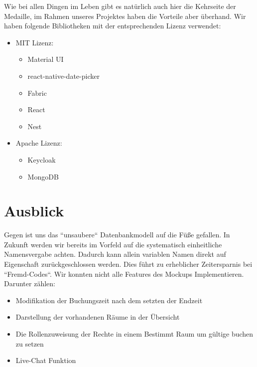 Wie bei allen Dingen im Leben gibt es natürlich auch hier die Kehrseite der Medaille, im Rahmen unseres Projektes haben die Vorteile aber überhand. 
Wir haben folgende Bibliotheken mit der entsprechenden Lizenz verwendet:

\begin{itemize}
\item	MIT Lizenz:
\begin{itemize}
    \item	Material UI
    \item	react-native-date-picker
    \item	Fabric
    \item	React
    \item	Nest
\end{itemize}
\end{itemize}
\begin{itemize}
    \item	Apache Lizenz:
    \begin{itemize}
\item	Keycloak
\item	MongoDB
\end{itemize}
\end{itemize}


\section{Ausblick}
Gegen ist uns das “unsaubere“ Datenbankmodell auf die Füße gefallen. 
In Zukunft werden wir bereits im Vorfeld auf die systematisch einheitliche Namensvergabe achten. 
Dadurch kann allein variablen Namen direkt auf Eigenschaft zurückgeschlossen werden.
 Dies führt zu erheblicher Zeitersparnis bei “Fremd-Codes“. Wir konnten nicht alle Features des Mockups Implementieren. \\
 Darunter zählen:
\begin{itemize}
    \item	Modifikation der Buchungszeit nach dem setzten der Endzeit
    \item	Darstellung der vorhandenen Räume in der Übersicht
    \item	Die Rollenzuweisung der Rechte in einem Bestimmt Raum um gültige buchen zu setzen 
    \item	Live-Chat Funktion  
\end{itemize}
